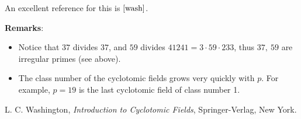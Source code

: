 \documentclass[12pt]{article}
\begin{document}
\begin{enumerate}
An excellent reference for this is $\cite{wash}$.

{\bf Remarks}:
\begin{itemize}
\item Notice that $37$ divides $37$, and $59$ divides $41241=3\cdot 59\cdot 233$, thus $37,\ 59$ are irregular primes (see above).  

\item The class number of the cyclotomic fields grows very quickly with $p$. For example, $p=19$ is the last cyclotomic field of class number 1.

\end{itemize}

\end{enumerate}

\begin{thebibliography}{9}
 L. C. Washington, {\em Introduction to Cyclotomic Fields},
Springer-Verlag, New York.
\end{thebibliography}
\end{document}
